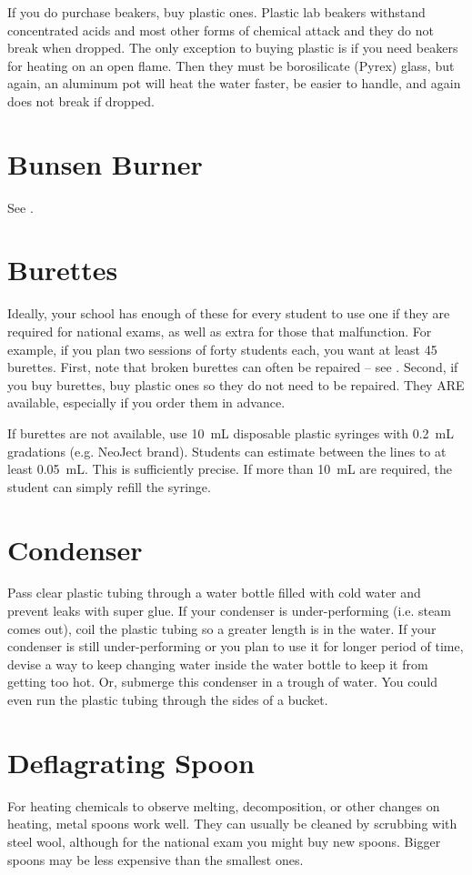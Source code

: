 If you do purchase beakers, 
buy plastic ones. 
Plastic lab beakers withstand concentrated acids 
and most other forms of chemical attack 
and they do not break when dropped. 
The only exception to buying plastic is 
if you need beakers for heating on an open flame. 
Then they must be borosilicate (Pyrex) glass, 
but again, 
an aluminum pot will heat the water faster, 
be easier to handle, 
and again does not break if dropped.

\section{Bunsen Burner}
See .

\section{Burettes}
Ideally, 
your school has enough of these for every student 
to use one if they are required for national exams, 
as well as extra for those that malfunction. 
For example, 
if you plan two sessions of forty students each, 
you want at least 45 burettes. 
First, 
note that broken burettes can often be repaired -- 
see . 
Second, 
if you buy burettes, 
buy plastic ones so they do not need to be repaired. 
They ARE available, 
especially if you order them in advance.

If burettes are not available, 
use 10~mL disposable plastic syringes with 0.2~mL gradations (e.g. 
NeoJect brand). 
Students can estimate between the lines to at least 0.05~mL. 
This is sufficiently precise. 
If more than 10~mL are required, 
the student can simply refill the syringe.

\section{Condenser}
Pass clear plastic tubing through a water bottle filled 
with cold water and prevent leaks with super glue. 
If your condenser is under-performing (i.e. 
steam comes out), 
coil the plastic tubing so a greater length is in the water. 
If your condenser is still under-performing 
or you plan to use it for longer period of time, 
devise a way to keep changing water inside the water bottle 
to keep it from getting too hot. 
Or, 
submerge this condenser in a trough of water. 
You could even run the plastic tubing through the sides of a bucket.

\section{Deflagrating Spoon}
\label{sec:deflagratingspoon}
For heating chemicals to observe melting, 
decomposition, 
or other changes on heating, 
metal spoons work well. 
They can usually be cleaned by scrubbing with steel wool, 
although for the national exam you might buy new spoons. 
Bigger spoons may be less expensive than the smallest ones.

